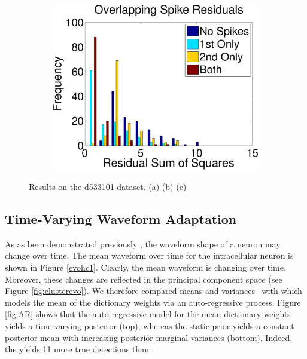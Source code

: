 \begin{center}
\begin{figure}
\begin{subfigure}[b]{.3\textwidth}
\includegraphics[width=\textwidth]{../figs/overlappingstat.pdf}
\caption{}
\label{fig:resid}
\end{subfigure}
\caption{Results on the d533101 dataset.  (a)  (b)  (c) }
\end{figure}
\end{center}



\subsection{Time-Varying Waveform Adaptation} \label{sub:adapt}


As as been demonstrated previously \cite{calabrese2011kalman}, the waveform shape of a neuron may change over time.  The mean waveform over time for the intracellular neuron is shown in Figure \ref{evohc1}.  Clearly, the mean waveform is changing over time.  Moreover, these changes are reflected in the principal component space (see Figure \ref{fig:clusterevo}).  We therefore compared means and variances \smug\ with \smug{} which models the mean of the dictionary weights via an auto-regressive process.  Figure \ref{fig:AR} shows that the auto-regressive model for the mean dictionary weights yields a time-varying posterior (top), whereas the static prior yields a constant posterior mean with increasing posterior marginal variances (bottom).  Indeed, the \smug{} yields 11 more true detections than \smug.
 


